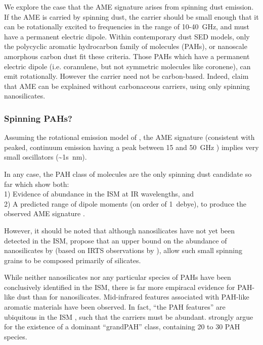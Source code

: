       We explore the case that the AME signature arises from spinning dust emission. If the AME is carried by spinning dust, the carrier should be small enough that it can be rotationally excited to frequencies in the range of 10-40~GHz, and must have a permanent electric dipole. Within contemporary dust SED models, only the polycyclic aromatic hydrocarbon family of molecules (PAHs), or nanoscale amorphous carbon dust fit these criteria. Those PAHs which have a permanent electric dipole (i.e. coranulene, but not symmetric molecules like coronene), can emit rotationally. However the carrier need not be carbon-based. Indeed, \cite{hensley17a} claim that AME can be explained without carbonaceous carriers, using only spinning nanosilicates.

     \subsubsection{Spinning PAHs?}
       Assuming the rotational emission model of \cite{draine98b}, the AME signature (consistent with peaked, continuum emission having a peak between 15 and 50~GHz ) implies very small oscillators (\textasciitilde{}1s~nm).

       In any case, the PAH class of molecules are the only spinning dust candidate so far which show both: \\
       1) Evidence of abundance in the ISM at IR wavelengths, and \\
       2) A predicted range of dipole moments (on order of 1~debye), to produce the observed AME signature \citep{draine98b, lovas05, thorwirth07}.

       However, it should be noted that although nanosilicates have not yet been detected in the ISM, \cite{hensley17a} propose that an upper bound on the abundance of nanosilicates by \cite{li01} (based on IRTS observations by \cite{onaka96}), allow such small spinning grains to be composed primarily of silicates.

    While neither nanosilicates nor any particular species of PAHs have been conclusively identified in the ISM, there is far more empiracal evidence for PAH-like dust than for nanosilicates. Mid-infrared features associated with PAH-like aromatic materials have been observed. In fact, ``the PAH features'' are ubiquitous in the ISM \citep{giard94,onaka96,onaka00}, such that the carriers must be abundant. \cite{andrews15} strongly argue for the  existence of a dominant ``grandPAH'' class, containing 20 to 30 PAH species.

